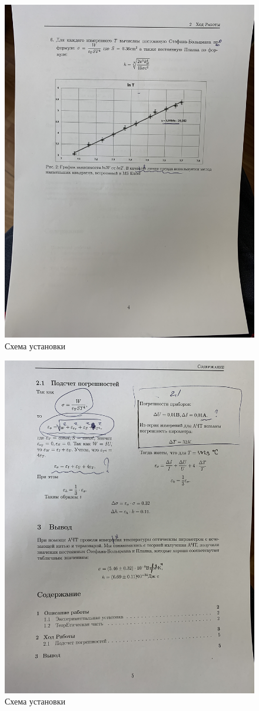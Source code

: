 \documentclass[a4paper,12pt]{article}
\theoremstyle{plain} %
\theoremstyle{definition} %
\theoremstyle{remark} %
\begin{document}
\begin{figure}[h]
        \includegraphics[width=1 \textwidth,angle = 270]{Materials/graph/IMG_2482.JPG}
    \caption{Схема установки}
\end{figure}


\begin{figure}[h]
        \includegraphics[width=1\textwidth,  angle = 270]{Materials/graph/IMG_2483.JPG}
    \caption{Схема установки}
\end{figure}
\end{document}
